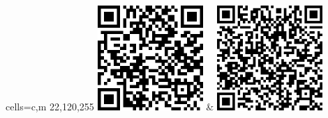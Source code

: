 \noindent\begin{tblr}[
        long,
        theme=no-caption
    ]{
        cells={c,m}
    }
     22,120,255
    \includegraphics[height=4cm]{resources/pay/Ali_pay.png} & %
    \includegraphics[height=4cm]{resources/pay/Wechat_pay.png}
\end{tblr}

